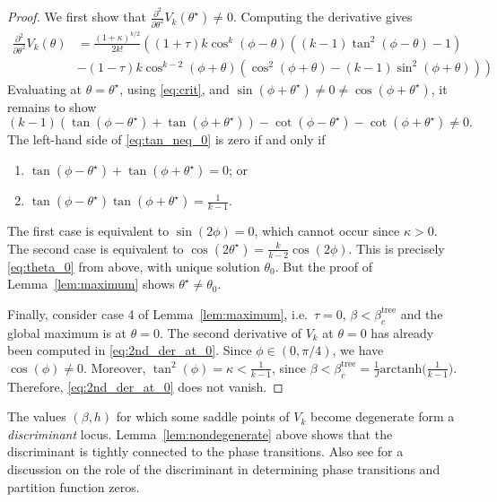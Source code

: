 \documentclass{article}
\numberwithin{theorem}{section}
\theoremstyle{remark}
\begin{document}
\begin{proof}
  We first show that $\frac{\partial^2}{\partial \theta^2} V_k(\theta^\star) \neq 0$. Computing the derivative gives 
  \begin{align*}
    \frac{\partial^2}{\partial \theta^2} V_k(\theta) & = \frac{(1+\kappa)^{k/2}}{2 k!} \left( (1+\tau) k \cos^k(\phi - \theta)\left( (k-1)\tan^2(\phi - \theta) -1 \right) \right. \\ 
    & - \left. (1-\tau) k \cos^{k-2}(\phi + \theta) \left( \cos^2(\phi+\theta) - (k-1)\sin^2(\phi+\theta) \right) \right)
  \end{align*}
  Evaluating at $\theta = \theta^\star$, using \eqref{eq:crit}, and $\sin(\phi+\theta^\star) \neq 0 \neq \cos(\phi+\theta^\star)$, it remains to show
  \begin{equation}
    \label{eq:tan_neq_0}
    (k-1) \left( \tan(\phi-\theta^\star) + \tan(\phi+\theta^\star) \right) - \cot(\phi-\theta^\star) - \cot(\phi+\theta^\star) \neq 0.
  \end{equation}
  The left-hand side of \eqref{eq:tan_neq_0} is zero if and only if 
  \begin{enumerate}
    \item $\tan(\phi-\theta^\star) + \tan(\phi+\theta^\star) = 0$; or
    \item $\tan(\phi-\theta^\star) \tan(\phi+\theta^\star) = \frac{1}{k-1}$.
  \end{enumerate}
  The first case is equivalent to $\sin(2\phi) = 0$, which cannot occur since $\kappa > 0$. The second case is equivalent to $\cos(2\theta^\star) = \frac{k}{k-2} \cos(2\phi)$. This is precisely \eqref{eq:theta_0} from above, with unique solution $\theta_0$. But the proof of Lemma~\ref{lem:maximum} shows $\theta^\star\neq \theta_0$.\par

  Finally, consider case 4 of Lemma~\ref{lem:maximum}, i.e.\ $\tau = 0$, $\beta < \beta_c^{\text{tree}}$ and the global maximum is at $\theta=0$. The second derivative of $V_k$ at $\theta=0$ has already been computed in \eqref{eq:2nd_der_at_0}.
  Since $\phi \in (0,\pi/4)$, we have $\cos(\phi)\neq 0$. Moreover, $\tan^2(\phi) = \kappa < \frac{1}{k-1}$, since $\beta < \beta_c^{\text{tree}} = \frac{1}{J}\mathrm{arctanh} \big(\tfrac{1}{k-1}\big)$. Therefore, \eqref{eq:2nd_der_at_0} does not vanish.
\end{proof}

The values $(\beta,h)$ for which some saddle points of $V_k$ become degenerate form a \emph{discriminant} locus. Lemma~\ref{lem:nondegenerate} above shows that the discriminant is tightly connected to the phase transitions. Also see \cite[Remark 3.5]{LeeYang} for a discussion on the role of the discriminant in determining phase transitions and partition function zeros. 
\end{document}
